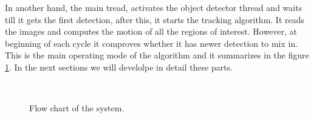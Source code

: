 \documentclass[12pt, a4paper, titlepage,twoside,openright]{article}
\begin{document}
In another hand, the main tread, activates the object detector thread and waits till it gets the first detection, after this, it starts the tracking algorithm. It reads the images and computes the motion of all the regions of interest. However, at beginning of each cycle it comproves whether it has newer detection to mix in. This is the main operating mode of the algorithm and it summarizes in the figure \ref{system1}. In the next sections we will develolpe in detail these parts. 

\begin{figure}[H]
		
\centering

\hspace{1cm}
\\


\caption{Flow chart of the system.}
\label{system1}
\end{figure}
\end{document}
